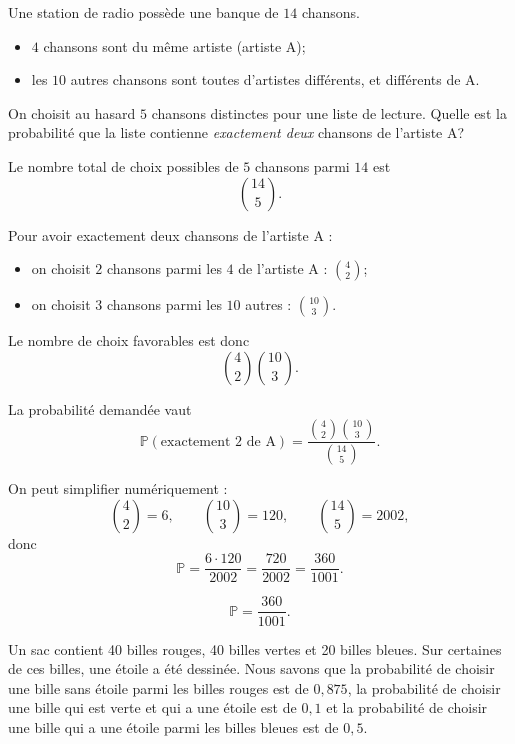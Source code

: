 \begin{questions}
\pageblanche
\question[10]


Une station de radio possède une banque de \(14\) chansons.
\begin{itemize}
\item \(4\) chansons sont du même artiste (artiste A);
\item les \(10\) autres chansons sont toutes d’artistes différents, et différents de A.
\end{itemize}

On choisit au hasard \(5\) chansons distinctes pour une liste de lecture. Quelle est la probabilité que la liste contienne \emph{exactement deux} chansons de l’artiste A?

\begin{solution}
Le nombre total de choix possibles de \(5\) chansons parmi \(14\) est
\[
\binom{14}{5}.
\]

Pour avoir exactement deux chansons de l’artiste A :
\begin{itemize}
\item on choisit \(2\) chansons parmi les \(4\) de l’artiste A : \(\binom{4}{2}\);
\item on choisit \(3\) chansons parmi les \(10\) autres : \(\binom{10}{3}\).
\end{itemize}

Le nombre de choix favorables est donc
\[
\binom{4}{2}\binom{10}{3}.
\]

La probabilité demandée vaut
\[
\mathbb{P}(\text{exactement 2 de A})
=
\frac{\binom{4}{2}\binom{10}{3}}{\binom{14}{5}}.
\]

On peut simplifier numériquement :
\[
\binom{4}{2}=6,\qquad \binom{10}{3}=120,\qquad \binom{14}{5}=2002,
\]
donc
\[
\mathbb{P}=\frac{6\cdot 120}{2002}=\frac{720}{2002}=\frac{360}{1001}.
\]

\[
\boxed{\mathbb{P}=\frac{360}{1001}.}
\]
\end{solution}


\pageblanche
\question[]

Un sac contient 40 billes rouges, 40 billes vertes et 20 billes bleues.
Sur certaines de ces billes, une étoile a été dessinée.
Nous savons que la probabilité de choisir une bille sans étoile parmi les billes rouges est de $0,875$, la probabilité de choisir une bille qui est verte et qui a une étoile est de $0,1$ et la probabilité de choisir une bille qui a une étoile parmi les billes bleues est de $0,5$.


\end{questions}
